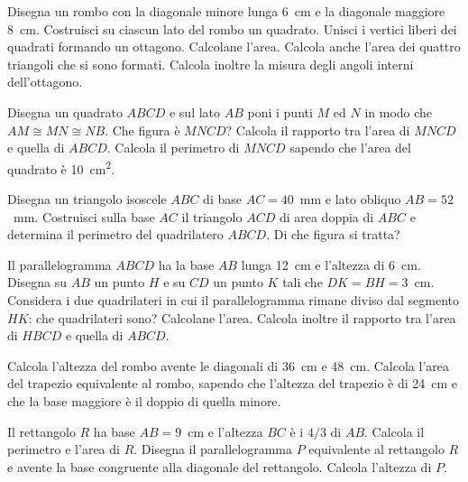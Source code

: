 \begin{multicols}{2}
\begin{esercizio}
\label{ese:7.43}
Disegna un rombo con la diagonale minore lunga 6~cm e la diagonale 
maggiore 8~cm. Costruisci su ciascun lato del rombo un quadrato. 
Unisci i vertici liberi dei quadrati formando un ottagono. Calcolane 
l'area. Calcola anche l'area dei quattro triangoli che si sono 
formati. Calcola inoltre la misura degli angoli interni dell'ottagono.
\end{esercizio}

\begin{esercizio}
\label{ese:7.44}
Disegna un quadrato $ABCD$ e sul lato $AB$ poni i punti $M$ ed $N$ in 
modo che $AM\cong MN\cong NB$. Che figura è $MNCD$? Calcola il 
rapporto tra l'area di $MNCD$ e quella di $ABCD$. Calcola il 
perimetro di $MNCD$ sapendo che l'area del quadrato è 
10~cm\textsuperscript{2}.
\end{esercizio}

\begin{esercizio}
\label{ese:7.45}
Disegna un triangolo isoscele $ABC$ di base $AC=40$~mm e lato obliquo 
$AB=52$~mm. Costruisci sulla base $AC$ il triangolo $ACD$ di area 
doppia di $ABC$ e determina il perimetro del quadrilatero $ABCD$. Di 
che figura si tratta?
\end{esercizio}

\begin{esercizio}
\label{ese:7.46}
Il parallelogramma $ABCD$ ha la base $AB$ lunga 12~cm e l'altezza di 
6~cm. Disegna su $AB$ un punto $H$ e su $CD$ un punto $K$ tali che 
$DK=BH=3$~cm. Considera i due quadrilateri in cui il parallelogramma 
rimane diviso dal segmento $HK$: che quadrilateri sono? Calcolane 
l'area. Calcola inoltre il rapporto tra l'area di $HBCD$ e quella di 
$ABCD$.
\end{esercizio}

\begin{esercizio}
\label{ese:7.47}
Calcola l'altezza del rombo avente le diagonali di 36~cm e 48~cm. 
Calcola l'area del trapezio equivalente al rombo, sapendo che 
l'altezza del trapezio è di 24~cm e che la base maggiore è il doppio 
di quella minore.
\end{esercizio}

\begin{esercizio}
\label{ese:7.48}
Il rettangolo $R$ ha base $AB = 9$~cm e l'altezza $BC$ è i $4/3$ di 
$AB$. Calcola il perimetro e l'area di $R$. Disegna il 
parallelogramma $P$ equivalente al rettangolo $R$ e avente la base 
congruente alla diagonale del rettangolo. Calcola l'altezza di $P$.
\end{esercizio}


\end{multicols}
